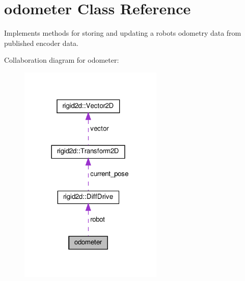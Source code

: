 \hypertarget{classodometer}{}\section{odometer Class Reference}
\label{classodometer}


Implements methods for storing and updating a robot\textquotesingle{}s odometry data from published encoder data.  




Collaboration diagram for odometer\+:
\nopagebreak
\begin{figure}[H]
\begin{center}
\leavevmode
\includegraphics[width=194pt]{classodometer__coll__graph}
\end{center}
\end{figure}

